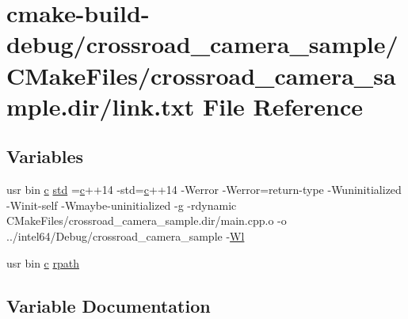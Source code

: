 \hypertarget{crossroad__camera__sample_2CMakeFiles_2crossroad__camera__sample_8dir_2link_8txt}{}\section{cmake-\/build-\/debug/crossroad\+\_\+camera\+\_\+sample/\+C\+Make\+Files/crossroad\+\_\+camera\+\_\+sample.dir/link.txt File Reference}
\label{crossroad__camera__sample_2CMakeFiles_2crossroad__camera__sample_8dir_2link_8txt}
\subsection*{Variables}
\begin{DoxyCompactItemize}
\item 
usr bin \hyperlink{CMakeCache_8txt_aac1d6a1710812201527c735f7c6afbaa}{c} \hyperlink{crossroad__camera__sample_2CMakeFiles_2crossroad__camera__sample_8dir_2link_8txt_a1ccfea5f558575a112db71eeb271fabf}{std} =\hyperlink{CMakeCache_8txt_aac1d6a1710812201527c735f7c6afbaa}{c}++14 -\/std=\hyperlink{CMakeCache_8txt_aac1d6a1710812201527c735f7c6afbaa}{c}++14 -\/Werror -\/Werror=return-\/type -\/Wuninitialized -\/Winit-\/self -\/Wmaybe-\/uninitialized -\/g -\/rdynamic C\+Make\+Files/crossroad\+\_\+camera\+\_\+sample.\+dir/main.\+cpp.\+o -\/o ../intel64/Debug/crossroad\+\_\+camera\+\_\+sample -\/\hyperlink{thirdparty_2extension_2CMakeFiles_2cpu__extension_8dir_2link_8txt_af9ccbf658ed2deb89d0d79f211e5b033}{Wl}
\item 
usr bin \hyperlink{CMakeCache_8txt_aac1d6a1710812201527c735f7c6afbaa}{c} \hyperlink{crossroad__camera__sample_2CMakeFiles_2crossroad__camera__sample_8dir_2link_8txt_ab9d7fd7120fafa2118a4e08c1df697c7}{rpath}
\end{DoxyCompactItemize}


\subsection{Variable Documentation}

